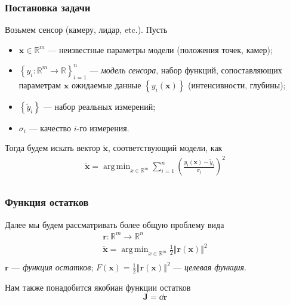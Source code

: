 \documentclass[notheorems,aspectratio=169]{beamer}
\DeclareMathOperator*{\argmin}{arg\,min}
\begin{document}
\begin{frame}
  \frametitle{Постановка задачи}
  Возьмем сенсор (камеру, лидар, etc.). Пусть 
  \begin{itemize}
  \item $\mathbf{x}\in \mathbb{R}^m$ --- неизвестные параметры модели (положения точек, камер);
  \item $\left\{y_i: \mathbb{R}^m\to \mathbb{R}\right\}_{i=1}^n$ --- \emph{модель сенсора}, набор функций, сопоставляющих параметрам $\mathbf{x}$ ожидаемые данные $\left\{y_i\left(\mathbf{x}\right)\right\}$ (интенсивности, глубины); 
  \item $\left\{\tilde{y}_i\right\}$ --- набор реальных измерений;
  \item $\sigma_i$ --- качество $i$-го измерения.
  \end{itemize} 
  Тогда будем искать вектор $\mathbf{\tilde{x}}$, соответствующий модели, как
  \begin{equation*}
    \begin{gathered}
      \mathbf{\tilde{x}}=\argmin_{x\in \mathbb{R}^m}\sum_{i=1}^n \left(\frac{y_i\left(\mathbf{x}\right)-\tilde{y}_i}{\sigma_i}\right)^2 \\
    \end{gathered}
  \end{equation*}
\end{frame}

\begin{frame} 
  \frametitle{Функция остатков}
  Далее мы будем рассматривать более общую проблему вида
  \begin{equation*}
    \begin{gathered}
      \mathbf{r}: \mathbb{R}^m\to\mathbb{R}^n \\
      \mathbf{\tilde{x}}=\argmin_{x\in\mathbb{R}^m}\frac{1}{2}\left\Vert\mathbf{r}\left(\mathbf{x}\right)\right\Vert^2 \\
    \end{gathered}
  \end{equation*}
  $\mathbf{r}$ --- \emph{функция остатков}; $F\left(\mathbf{x}\right)=\frac{1}{2}\left\Vert\mathbf{r}\left(\mathbf{x}\right)\right\Vert^2$ --- \emph{целевая функция}.
  
  Нам также понадобится якобиан функции остатков
  $$\mathbf{J}=\dd{\mathbf{r}}$$
\end{frame}
\end{document}
